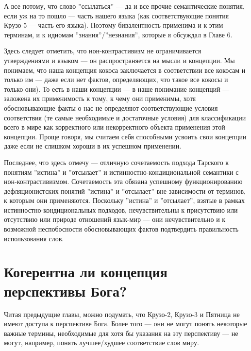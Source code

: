 \documentclass[11pt]{book}
\begin{document}
А все потому, что слово ''ссылаться'' --- да и все прочие семантические понятия, если уж на то пошло --- часть нашего языка (как соответствующие понятия Крузо-5 --- часть его языка). Поэтому бивалентность применима и к этим терминам, и к идиомам ''знания''/''незнания'', которые я обсуждал в Главе 6.

Здесь следует отметить, что нон-контрастивизм не ограничивается утверждениями и языком --- он распространяется на мысли и концепции. Мы понимаем, что наша концепция кокоса заключается в соответствии все кокосам и только им --- даже если нет фактов, определяющих, что такое все кокосы и только они). То есть в наши концепции --- в наше понимание концепций --- заложена их применимость к тому, к чему они применимы, хотя обосновывающие факты о нас не определяют соответствующие условия соответствия (те самые необходимые и достаточные условия) для классификации всего в мире как корректного или некорректного объекта применения этой концепции. Проще говоря, мы считаем себя способными усвоить свои концепции даже если не слишком хороши в их успешном применении.

Последнее, что здесь отмечу --- отличную сочетаемость подхода Тарского к понятиям ''истина'' и ''отсылает'' и истинностно-кондициональной семантики с нон-контрастивизмом. Сочетаемость эта обязана успешному функционированию дефляционистских понятий ''истина'' и ''отсылает'' вне зависимости от терминов, к которым они применяются. Поскольку ''истина'' и ''отсылает'', взятые в рамках истинностно-кондициональных подходов, нечувствительны к присутствию или отсутствию или природе отношений язык-мир --- они нечувствительно и к возможной неспобосности обосновывающих фактов подтвердить правильность использования слов.

\section{Когерентна ли концепция перспективы Бога?}

Читая предыдущие главы, можно подумать, что Крузо-2, Крузо-3 и Пятница не имеют доступа к перспективе Бога. Более того --- они не могут понять некоторые важные термины, необходимые для хотя бы указания на эту перспективу --- не могут, например, понять лучшее/худшее соответствие слов миру.
\end{document}
